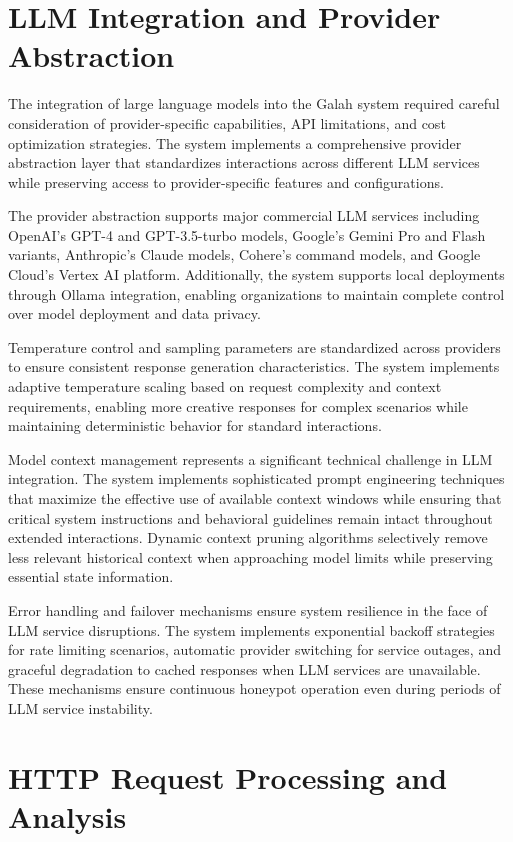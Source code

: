 \section{LLM Integration and Provider Abstraction}

The integration of large language models into the Galah system required careful consideration of provider-specific capabilities, API limitations, and cost optimization strategies. The system implements a comprehensive provider abstraction layer that standardizes interactions across different LLM services while preserving access to provider-specific features and configurations.

The provider abstraction supports major commercial LLM services including OpenAI's GPT-4 and GPT-3.5-turbo models, Google's Gemini Pro and Flash variants, Anthropic's Claude models, Cohere's command models, and Google Cloud's Vertex AI platform. Additionally, the system supports local deployments through Ollama integration, enabling organizations to maintain complete control over model deployment and data privacy.

Temperature control and sampling parameters are standardized across providers to ensure consistent response generation characteristics. The system implements adaptive temperature scaling based on request complexity and context requirements, enabling more creative responses for complex scenarios while maintaining deterministic behavior for standard interactions.

Model context management represents a significant technical challenge in LLM integration. The system implements sophisticated prompt engineering techniques that maximize the effective use of available context windows while ensuring that critical system instructions and behavioral guidelines remain intact throughout extended interactions. Dynamic context pruning algorithms selectively remove less relevant historical context when approaching model limits while preserving essential state information.

Error handling and failover mechanisms ensure system resilience in the face of LLM service disruptions. The system implements exponential backoff strategies for rate limiting scenarios, automatic provider switching for service outages, and graceful degradation to cached responses when LLM services are unavailable. These mechanisms ensure continuous honeypot operation even during periods of LLM service instability.

\section{HTTP Request Processing and Analysis}

